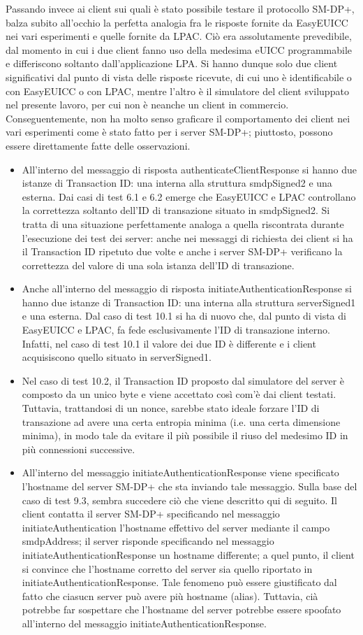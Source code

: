 \documentclass[10pt, oneside]{book}
\begin{document}
\noindent Passando invece ai client sui quali è stato possibile testare il protocollo SM-DP+, balza subito all'occhio la perfetta analogia fra le risposte fornite da EasyEUICC nei vari esperimenti e quelle fornite da LPAC. Ciò era assolutamente prevedibile, dal momento in cui i due client fanno uso della medesima eUICC programmabile e differiscono soltanto dall'applicazione LPA. Si hanno dunque solo due client significativi dal punto di vista delle risposte ricevute, di cui uno è identificabile o con EasyEUICC o con LPAC, mentre l'altro è il simulatore del client sviluppato nel presente lavoro, per cui non è neanche un client in commercio. Conseguentemente, non ha molto senso graficare il comportamento dei client nei vari esperimenti come è stato fatto per i server SM-DP+; piuttosto, possono essere direttamente fatte delle osservazioni.
\begin{itemize}
\item All'interno del messaggio di risposta authenticateClientResponse si hanno due istanze di Transaction ID: una interna alla struttura smdpSigned2 e una esterna. Dai casi di test 6.1 e 6.2 emerge che EasyEUICC e LPAC controllano la correttezza soltanto dell'ID di transazione situato in smdpSigned2. Si tratta di una situazione perfettamente analoga a quella riscontrata durante l'esecuzione dei test dei server: anche nei messaggi di richiesta dei client si ha il Transaction ID ripetuto due volte e anche i server SM-DP+ verificano la correttezza del valore di una sola istanza dell'ID di transazione.
\item Anche all'interno del messaggio di risposta initiateAuthenticationResponse si hanno due istanze di Transaction ID: una interna alla struttura serverSigned1 e una esterna. Dal caso di test 10.1 si ha di nuovo che, dal punto di vista di EasyEUICC e LPAC, fa fede esclusivamente l'ID di transazione interno. Infatti, nel caso di test 10.1 il valore dei due ID è differente e i client acquisiscono quello situato in serverSigned1.
\item Nel caso di test 10.2, il Transaction ID proposto dal simulatore del server è composto da un unico byte e viene accettato così com'è dai client testati. Tuttavia, trattandosi di un nonce, sarebbe stato ideale forzare l'ID di transazione ad avere una certa entropia minima (i.e. una certa dimensione minima), in modo tale da evitare il più possibile il riuso del medesimo ID in più connessioni successive.
\item All'interno del messaggio initiateAuthenticationResponse viene specificato l'hostname del server SM-DP+ che sta inviando tale messaggio. Sulla base del caso di test 9.3, sembra succedere ciò che viene descritto qui di seguito. Il client contatta il server SM-DP+ specificando nel messaggio initiateAuthentication l'hostname effettivo del server mediante il campo smdpAddress; il server risponde specificando nel messaggio initiateAuthenticationResponse un hostname differente; a quel punto, il client si convince che l'hostname corretto del server sia quello riportato in initiateAuthenticationResponse. Tale fenomeno può essere giustificato dal fatto che ciasucn server può avere più hostname (alias). Tuttavia, cià potrebbe far sospettare che l'hostname del server potrebbe essere spoofato all'interno del messaggio initiateAuthenticationResponse.

\end{itemize}
\end{document}
